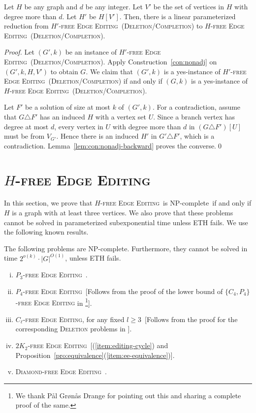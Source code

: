 \documentclass[envcountsame,envcountsect,10pt,oribibl]{llncs}
\newcommand{\pname}[1]{\textnormal{\textsc{#1}}}
\newcommand{\cclass}[1]{\textnormal{\textsf{#1}}}
\newcommand{\HEE}{\pname{$H$-free Edge Editing}}
\newcommand{\HDEE}{\pname{$H'$-free Edge Editing}}
\newcommand{\PTEE}{\pname{$P_3$-free Edge Editing}}
\newcommand{\PFEE}{\pname{$P_4$-free Edge Editing}}
\newcommand{\CLEE}{\pname{$C_\ell$-free Edge Editing}}
\newcommand{\TWKTEE}{\pname{$2K_2$-free Edge Editing}}
\newcommand{\DEE}{\pname{Diamond-free Edge Editing}}
\newcommand{\NPC}{\cclass{NP-complete}}
\begin{document}
\begin{lemma}
  \label{lem:degree}
  Let $H$ be any graph and $d$ be any integer. Let $V'$ be the set of vertices
  in $H$ with degree more than $d$.
  Let $H'$ be $H[V']$. Then, there is a linear parameterized reduction
  from \HDEE~(\textsc{Deletion}/\textsc{Completion}) to \HEE~(\textsc{Deletion}/\textsc{Completion}).
\end{lemma}
\begin{proof}
  Let $(G',k)$ be an instance of \HDEE~(\textsc{Deletion}/\textsc{Completion}).
  Apply Construction~\ref{con:nonadj} on $(G',k,H,V')$ to obtain $G$.
  We claim that $(G',k)$ is a yes-instance of \HDEE~(\textsc{Deletion}/\textsc{Completion})
  if and only if $(G,k)$ is a yes-instance of \HEE~(\textsc{Deletion}/\textsc{Completion}).

  Let $F'$ be a solution of size at most $k$ of $(G',k)$. For a contradiction,
  assume that $G\triangle F'$ has an induced $H$ with a vertex set $U$.
  Since a branch vertex has degree at most $d$, every vertex in $U$
  with degree more than $d$ in $(G\triangle F')[U]$ must be from $V_{G'}$.
  Hence there is an induced $H'$ in $G'\triangle F'$, which is a contradiction.
  Lemma~\ref{lem:con:nonadj-backward} proves the converse.\qed
\end{proof}
\section{\HEE}
\label{sec:editing}

In this section, we prove that \HEE\ is \NPC\
if and only if $H$ is a graph with at least three vertices.
We also prove that these problems cannot be solved in 
parameterized subexponential time unless ETH fails.
We use the following known results.

\begin{proposition}
  \label{pro:editing-base}
  The following problems are \NPC. Furthermore, they cannot be 
  solved in time $2^{o(k)}\cdot |G|^{O(1)}$, unless ETH fails.
  \begin{enumerate}[(i)]
  \item\label{item:editing-p3} \PTEE~\cite{komusiewicz2012cluster}.
\item\label{item:editing-p4} \PFEE~[Follows from the proof of the lower 
    bound of \textsc{$\{C_4,P_4\}$-free Edge Editing} in \cite        
    {drange2015trivially}\footnote{We thank P{\aa}l Gr{\o}n{\aa}s Drange for pointing out this and sharing a complete proof of the same.}].
  \item\label{item:editing-cycle} \CLEE, for any fixed $l\geq 3$~[Follows
    from the proof for the corresponding \textsc{Deletion} problems in \cite{DBLP:journals/siamcomp/Yannakakis81}].
  \item\label{item:editing-2k2} \TWKTEE~[(\ref{item:editing-cycle}) and 
    Proposition~\ref{pro:equivalence}(\ref{item:ee-equivalence})].
  \item\label{item:editing-diamond} \DEE~\cite{DBLP:journals/classification/BarthelemyB01}.
  \end{enumerate}
\end{proposition}
\end{document}
